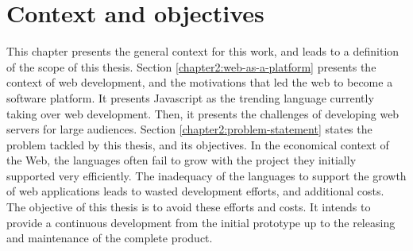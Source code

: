 \chapter{Context and objectives} \label{chapter2}
\minitoc
\eject

This chapter presents the general context for this work, and leads to a definition of the scope of this thesis.
Section \ref{chapter2:web-as-a-platform} presents the context of web development, and the motivations that led the web to become a software platform.
It presents Javascript as the trending language currently taking over web development.
Then, it presents the challenges of developing web servers for large audiences.
Section \ref{chapter2:problem-statement} states the problem tackled by this thesis, and its objectives.
In the economical context of the Web, the languages often fail to grow with the project they initially supported very efficiently.
The inadequacy of the languages to support the growth of web applications leads to wasted development efforts, and additional costs.
The objective of this thesis is to avoid these efforts and costs.
It intends to provide a continuous development from the initial prototype up to the releasing and maintenance of the complete product.


